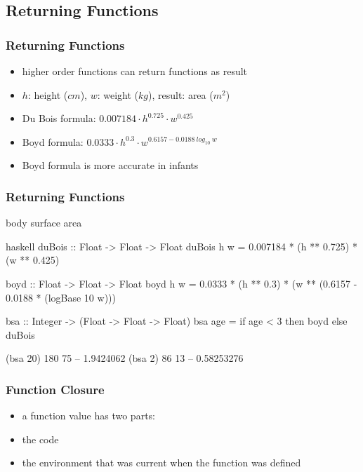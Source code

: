 \documentclass[dvipsnames]{beamer}
\theoremstyle{plain}
\begin{document}
\subsection{Returning Functions}

\begin{frame}
  \frametitle{Returning Functions}

  \begin{itemize}
    \item higher order functions can return functions as result
  \end{itemize}

  \begin{example}
    \begin{itemize}
      \item $h$: height ($cm$), $w$: weight ($kg$), result: area ($m^2$)
      \smallskip
      \item Du Bois formula:
        $0.007184 \cdot h^{0.725} \cdot w^{0.425}$\\
      \smallskip
      \item Boyd formula:
        $0.0333 \cdot h^{0.3} \cdot w^{0.6157 - 0.0188~log_{10}~w}$
      \smallskip
      \item Boyd formula is more accurate in infants
    \end{itemize}
  \end{example}
\end{frame}

\begin{frame}[fragile]
  \frametitle{Returning Functions}

  \begin{exampleblock}{body surface area}
    \begin{pygments}{haskell}
duBois :: Float -> Float -> Float
duBois h w = 0.007184 * (h ** 0.725) * (w ** 0.425)

boyd :: Float -> Float -> Float
boyd h w = 0.0333 * (h ** 0.3) *
           (w ** (0.6157 - 0.0188 * (logBase 10 w)))

bsa :: Integer -> (Float -> Float -> Float)
bsa age = if age < 3 then boyd else duBois

(bsa 20) 180 75  -- 1.9424062
(bsa 2) 86 13    -- 0.58253276
    \end{pygments}
  \end{exampleblock}
\end{frame}

\begin{frame}[fragile]
  \frametitle{Function Closure}

  \begin{itemize}
    \item a function value has two parts:

    \medskip
    \item the code
    \item the environment that was current when the function was defined
  \end{itemize}
\end{frame}
\end{document}
